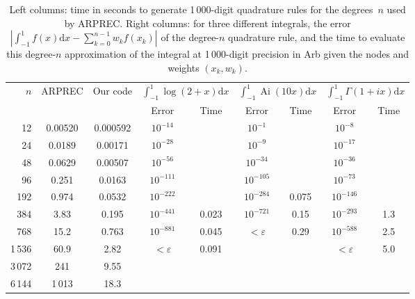 \documentclass[nohypdvips,review]{siamart0216}
\newcommand{\dx}{\mathrm d x}
\begin{document}
\begin{table}[t!]
\caption{Left columns: time in seconds to generate 1\,000-digit
quadrature rules for the degrees~$n$ used by ARPREC.
Right columns: for three different integrals, the
error $|\int_{-1}^1 f(x) \dx - \sum_{k=0}^{n-1} w_k f(x_k)|$ of the degree-$n$
quadrature rule, and the time to evaluate this degree-$n$ approximation
of the integral at 1\,000-digit precision in Arb given the nodes and weights $(x_k, w_k)$.}
\begin{center}
\begin{tabular}{ r | c c | c c| c c | c c }
$n$ & ARPREC\! & Our code &
    \multicolumn{2}{|c|}{$\int_{-1}^{1}\!\log(2\!+\!x) \dx$} &
    \multicolumn{2}{|c|}{$\int_{-1}^{1}\!\operatorname{Ai}(10 x) \dx$} &
    \multicolumn{2}{|c}{$\int_{-1}^{1}\!\Gamma(1\!+\!ix) \dx$} \\
   &         &          & Error   & Time      &  Error & Time  &  Error & Time \\ \hline
\rule{0pt}{3ex}12 & 0.00520 & 0.000592 & $10^{-14}$ &       &   $10^{-1}$ &  &  $10^{-8}$ & \\
24 & 0.0189 & 0.00171 & $10^{-28}$  &       &  $10^{-9}$  & &  $10^{-17}$ & \\
48 & 0.0629 & 0.00507 & $10^{-56}$ &        &  $10^{-34}$  &    &  $10^{-36}$ & \\
96 & 0.251 & 0.0163 & $10^{-111}$  &         &  $10^{-105}$ &          &  $10^{-73}$ & \\
192 & 0.974 & 0.0532 & $10^{-222}$ &         &  $10^{-284}$ &    0.075      &   $10^{-146}$ & \\
384 & 3.83 & 0.195 & $10^{-441}$  &  0.023        & $10^{-721}$ & 0.15           &   $10^{-293}$ & 1.3 \\
768 & 15.2 & 0.763 & $10^{-881}$ & 0.045      & $<\varepsilon$ & 0.29           &   $10^{-588}$ & 2.5 \\
1\,536 & 60.9 & 2.82 & $<\varepsilon$ &  0.091     &                &    &            $<\varepsilon$ & 5.0 \\
3\,072 & 241 & 9.55 &  &  &  &  &  &  \\
6\,144 & 1\,013 & 18.3 &  &  &  &  &  &  \\
\end{tabular}
\label{tab:arprectimings}
\end{center}
\end{table}
\end{document}
